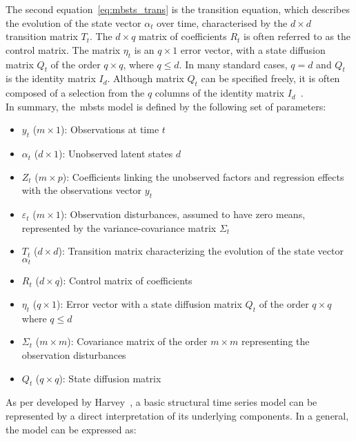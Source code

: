     The second equation~\ref{eq:mbsts_trans} is the transition equation, which describes the evolution of the state vector
    $\alpha_{t}$ over time, characterised by the $d \times d$ transition matrix $T_{t}$.
    The $d \times q$ matrix of coefficients $R_{t}$ is often referred to as the control matrix.
    The matrix $\eta_{t}$ is an $q \times 1$ error vector,
    with a state diffusion matrix $Q_{t}$ of the order $q \times q$, where $q \leq d$.
    In many standard cases, $q = d$ and $Q_{t}$ is the identity matrix $I_{d}$.
    Although matrix $Q_{t}$ can be specified freely,
    it is often composed of a selection from the $q$ columns of the identity matrix $I_{d}$~\cite{commandeur_introduction_2007}.\\

    In summary, the~\gls{mbsts} model is defined by the following set of parameters:

    \begin{itemize}
        \item $y_{t}$ ($m \times 1$): Observations at time $t$
        \item $\alpha_{t}$ ($d \times 1$): Unobserved latent states $d$
        \item $Z_{t}$ ($m \times p$): Coefficients linking the unobserved factors and regression effects
            with the observations vector $y_{t}$
        \item $\varepsilon_{t}$ ($m \times 1$): Observation disturbances, assumed to have zero means,
            represented by the variance-covariance matrix $\Sigma_{t}$
        \item $T_{t}$ ($d \times d$): Transition matrix characterizing the evolution of the state vector $\alpha_{t}$
        \item $R_{t}$ ($d \times q$): Control matrix of coefficients
        \item $\eta_{t}$ ($q \times 1$): Error vector with a state diffusion matrix $Q_{t}$ of the order $q \times q$ where $q \leq d$
        \item $\Sigma_{t}$ ($m \times m$): Covariance matrix of the order $m \times m$ representing the observation disturbances
        \item $Q_{t}$ ($q \times q$): State diffusion matrix
    \end{itemize}

    As per developed by Harvey~\cite{harvey_forecasting_1990}, a basic structural time series model can be represented
    by a direct interpretation of its underlying components.
    In a general, the model can be expressed as:

